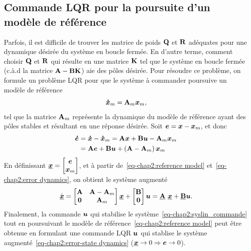 \subsection{Commande LQR pour la poursuite d'un modèle de référence}
Parfois, il est difficile de trouver les matrice de poids $\mathbf{Q}$ et $\mathbf{R}$ adéquates pour une dynamique désirée du système en boucle fermée. En d'autre terme, comment choisir $\mathbf{Q}$ et $\mathbf{R}$ qui résulte en une matrice $\mathbf{K}$ tel que le système en boucle fermée (c.à.d la matrice $\mathbf{A}-\mathbf{B}\mathbf{K}$) aie des pôles désirée. Pour résoudre ce problème,  on formule un problème LQR pour que le système à commander poursuive un modèle de référence
\begin{equation}\label{eq-chap2:reference model}
	\bm{\dot{x}}_m = \mathbf{A}_m\bm{x}_m,
\end{equation} tel que la matrice $\mathbf{A}_m$ représente la dynamique du modèle de référence ayant des pôles stables et résultant en une réponse désirée. Soit $\bm{e}=\bm{x}-\bm{x}_m$, et donc
\begin{align}\label{eq-chap2:error dynamics}
	\begin{split}
		\bm{\dot{e}} &= \bm{\dot{x}}-\bm{\dot{x}}_m = \mathbf{A}\bm{x}+\mathbf{B}\bm{u}-\mathbf{A}_m\bm{x}_m \\
		&=\mathbf{A}\bm{e}+\mathbf{B}\bm{u}+\left(\mathbf{A}-\mathbf{A}_m\right)\bm{x}_m
	\end{split}
\end{align}
En définissant $\underline{\bm{x}} = \begin{bmatrix}\bm{e} \\ \bm{x}_m\end{bmatrix}$, et à partir de~\eqref{eq-chap2:reference model} et~\eqref{eq-chap2:error dynamics}, on obtient le système augmenté
\begin{equation}\label{eq-chap2:error-state dynamics}
	\dot{\underline{\state}}=\begin{bmatrix}
	\matriceA & \matriceA-\matriceA_m \\ \zeros & \matriceA_m 
	\end{bmatrix}\underline{\state} + \begin{bmatrix}
	\matriceB \\ \zeros  
	\end{bmatrix}\command = \underline{\matriceA}\ \underline{\state}+\underline{\matriceB}\command.
\end{equation}
Finalement, la commande $\bm{u}$ qui stabilise le  système~\eqref{eq-chap2:syslin_commande} tout en poursuivant le modèle de référence~\eqref{eq-chap2:reference model} peut être obtenue en formulant une commande LQR $\bm{u}$ qui stablise le système augmenté~\eqref{eq-chap2:error-state dynamics} ($\underline{\bm{x}}\rightarrow0\Rightarrow\bm{e}\rightarrow0$). 
